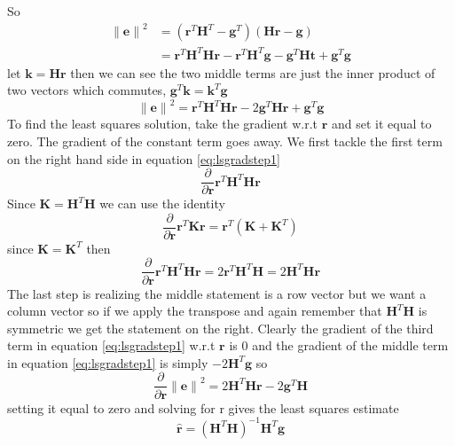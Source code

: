So 
\begin{equation}
	\begin{split}
		\mathbf{ \lVert \mathbf{e} \rVert }^2 & = ( \mathbf{r}^{T} \mathbf{H}^{T}  - \mathbf{g}^{T} )  ( \mathbf{Hr-g} ) \\
		& = \mathbf{r}^T \mathbf{H}^T \mathbf{H} \mathbf{r} - \mathbf{r}^T \mathbf{H}^T \mathbf{g} - \mathbf{g}^T \mathbf{H} \mathbf{t} + \mathbf{g}^T \mathbf{g}
	\end{split}
\end{equation}
let $\mathbf{k} = \mathbf{Hr}$ then we can see the two middle terms are just the inner product of two vectors which commutes, $\mathbf{g}^T \mathbf{k} = \mathbf{k}^T \mathbf{g}$
\begin{equation}\label{eq:lsgradstep1}
	\mathbf{ \lVert \mathbf{e} \rVert }^2 =  \mathbf{r}^{T} \mathbf{H}^{T} \mathbf{H} \mathbf{r} - 2 \mathbf{g}^{T} \mathbf{H} \mathbf{r} +   \mathbf{g}^T \mathbf{g}  
\end{equation}	
To find the least squares solution, take the gradient w.r.t $\mathbf{r}$ and set it equal to zero. The gradient of the constant term goes away. We first tackle the first term on the right hand side in equation \ref{eq:lsgradstep1}
\begin{equation}
\dfrac {\partial } {\partial \mathbf{r} }  \mathbf{r}^{T} \mathbf{H}^{T} \mathbf{H} \mathbf{r} 
\end{equation}
Since $\mathbf{K} = \mathbf{H}^T \mathbf{H}$ we can use the identity
\begin{equation}
\dfrac {\partial } {\partial \mathbf{r} }  \mathbf{r}^{T} \mathbf{K} \mathbf{r} = \mathbf{r}^T ( \mathbf{K} + \mathbf{K}^T)
\end{equation}
since $\mathbf{K}=\mathbf{K}^T$ then 
\begin{equation}
\dfrac {\partial } {\partial \mathbf{r} }  \mathbf{r}^{T} \mathbf{H}^{T} \mathbf{H} \mathbf{r}  = 2 \mathbf{r}^T \mathbf{H}^T \mathbf{H} = 2 \mathbf{H}^T \mathbf{H} \mathbf{r}
\end{equation}
The last step is realizing the middle statement is a row vector but we want a column vector so if we apply the transpose and again remember that $ \mathbf{H}^T \mathbf{H} $ is symmetric we get the statement on the right.   Clearly the gradient of the third term in equation \ref{eq:lsgradstep1} w.r.t $\mathbf{r}$ is $0$ and the gradient of the middle term in equation \ref{eq:lsgradstep1} is simply $- 2 \mathbf{H}^{T} \mathbf{g}$ so 
\begin{equation}
\dfrac {\partial } {\partial \mathbf{r} } \mathbf{ \lVert \mathbf{e} \rVert }^2  = 2 \mathbf{H}^T \mathbf{H} \mathbf{r} - 2 \mathbf{g}^{T} \mathbf{H}
\end{equation}
setting it equal to zero and solving for r gives the least squares estimate
\begin{equation}
	\hat{\mathbf{r}} = ( \mathbf{H}^{T} \mathbf{H} )^{-1} \mathbf{H}^T \mathbf{g}
\end{equation}

